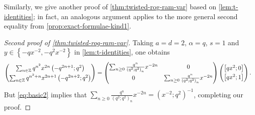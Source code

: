 \documentclass[reqno,11pt]{amsart}
\theoremstyle{definition}
\theoremstyle{remark}
\numberwithin{equation}{section}
\newcommand{\Z}{\mathbb{Z}}
\newcommand{\vect}[2]{\big[{#1};{#2}\big]}
\begin{document}
Similarly, we give another proof of \cref{thm:twisted-rog-ram-var} based on \cref{lem:t-identities}; in fact, an analogous argument applies to the more general second equality from \cref{prop:exact-formulae-kind1}.
\begin{proof}[Second proof of \cref{thm:twisted-rog-ram-var}]
Taking $a = d = 2$, $\alpha = q$, $s = 1$ and $y \in \left\{-qx^{-2}, -q^2x^{-2}\right\}$ in \cref{lem:t-identities}, one obtains 
\[
    \begin{pmatrix}
    \sum_{n \in \Z} q^{n^2} x^{2n} \left(-q^{2n+1}; q^2\right)
    \vspace{0.1cm} \\
    \sum_{n \in \Z} q^{n^2+n} x^{2n+1} \left(-q^{2n+2}; q^2\right)
    \end{pmatrix}
    =
    \begin{pmatrix}
    \sum_{n \ge 0} \frac{q^n}{\left(q^2; q^2\right)_n} x^{-2n} 
    & 0
    \vspace{0.1cm} \\
    0 & 
    \sum_{n \ge 0} \frac{q^n}{\left(q^2; q^2\right)_n} x^{-2n}
    \end{pmatrix}
    \begin{pmatrix}
    \vect{qx^2}{0} 
    \vspace{0.1cm} \\
    \vect{qx^2}{1}
    \end{pmatrix}.
\]
But \cref{eq:basic2} implies that $\sum_{n \ge 0} \frac{q^n}{\left(q^2; q^2\right)_n} x^{-2n} = \left(x^{-2}; q^2\right)^{-1}$, completing our proof.
\end{proof}
\end{document}
